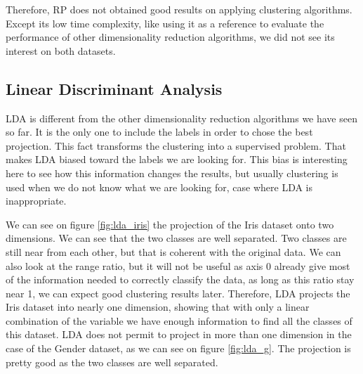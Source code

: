 \documentclass[twocolumn, 10pt]{article}
\begin{document}
			Therefore, RP does not obtained good results on applying clustering algorithms. Except its low time complexity, like using it as a reference to evaluate the performance of other dimensionality reduction algorithms, we did not see its interest on both datasets.
		\subsection{Linear Discriminant Analysis}
			LDA is different from the other dimensionality reduction algorithms we have seen so far. It is the only one to include the labels in order to chose the best projection. This fact transforms the clustering into a supervised problem. That makes LDA biased toward the labels we are looking for. This bias is interesting here to see how this information changes the results, but usually clustering is used when we do not know what we are looking for, case where LDA is inappropriate.

			We can see on figure \ref{fig:lda_iris} the projection of the Iris dataset onto two dimensions. We can see that the two classes are well separated. Two classes are still near from each other, but that is coherent with the original data. We can also look at the range ratio, but it will not be useful as axis 0 already give most of the information needed to correctly classify the data, as long as this ratio stay near 1, we can expect good clustering results later. Therefore, LDA projects the Iris dataset into nearly one dimension, showing that with only a linear combination of the variable we have enough information to find all the classes of this dataset. LDA does not permit to project in more than one dimension in the case of the Gender dataset, as we can see on figure \ref{fig:lda_g}. The projection is pretty good as the two classes are well separated.
\end{document}
